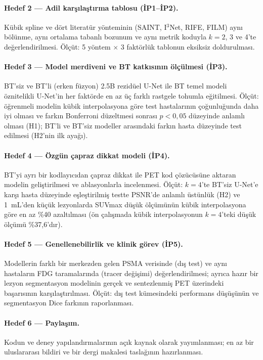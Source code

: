 \documentclass[11pt,a4paper]{article}
\begin{document}
\paragraph{Hedef 2 --- Adil karşılaştırma tablosu (İP1--İP2).} Kübik spline ve dört literatür
yönteminin (SAINT, I$^3$Net, RIFE, FILM) aynı bölünme, aynı ortalama tabanlı bozunum ve aynı
metrik koduyla $k = 2$, 3 ve 4'te değerlendirilmesi. Ölçüt: 5 yöntem $\times$ 3 faktörlük
tablonun eksiksiz doldurulması.

\paragraph{Hedef 3 --- Model merdiveni ve BT katkısının ölçülmesi (İP3).} BT'siz ve BT'li (erken
füzyon) 2.5B rezidüel U-Net ile BT temel modeli öznitelikli U-Net'in her faktörde en az üç farklı
rastgele tohumla eğitilmesi. Ölçüt: öğrenmeli modelin kübik interpolasyona göre test hastalarının
çoğunluğunda daha iyi olması ve farkın Bonferroni düzeltmesi sonrası $p < 0{,}05$ düzeyinde
anlamlı olması (H1); BT'li ve BT'siz modeller arasındaki farkın hasta düzeyinde test edilmesi
(H2'nin ilk ayağı).

\paragraph{Hedef 4 --- Özgün çapraz dikkat modeli (İP4).} BT'yi ayrı bir kodlayıcıdan çapraz
dikkat ile PET kod çözücüsüne aktaran modelin geliştirilmesi ve ablasyonlarla incelenmesi.
Ölçüt: $k = 4$'te BT'siz U-Net'e karşı hasta düzeyinde eşleştirilmiş testte PSNR'de anlamlı
üstünlük (H2) ve 1~mL'den küçük lezyonlarda SUVmax düşük ölçümünün kübik interpolasyona göre en
az \%40 azaltılması (ön çalışmada kübik interpolasyonun $k = 4$'teki düşük ölçümü \%37,6'dır).

\paragraph{Hedef 5 --- Genellenebilirlik ve klinik görev (İP5).} Modellerin farklı bir merkezden
gelen PSMA verisinde (dış test) ve aynı hastaların FDG taramalarında (tracer değişimi)
değerlendirilmesi; ayrıca hazır bir lezyon segmentasyon modelinin gerçek ve sentezlenmiş PET
üzerindeki başarısının karşılaştırılması. Ölçüt: dış test kümesindeki performans düşüşünün ve
segmentasyon Dice farkının raporlanması.

\paragraph{Hedef 6 --- Paylaşım.} Kodun ve deney yapılandırmalarının açık kaynak olarak
yayımlanması; en az bir uluslararası bildiri ve bir dergi makalesi taslağının hazırlanması.
\end{document}
